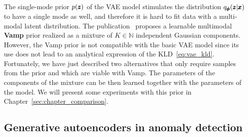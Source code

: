 The single-mode prior $p(\pmb{{z}})$ of the VAE model stimulates the distribution $q_{\pmb{{\phi}}}(\pmb{{z}}|\pmb{{x}})$ to have a single mode as well, and therefore it is hard to fit data with a multi-modal latent distribution. The publication~\cite{tomczak2018vae} proposes a learnable multimodal \textbf{Vamp} prior realized as a mixture of $K \in \mathbb{N}$ independent Gaussian components. However, the Vamp prior is not compatible with the basic VAE model since its use does not lead to an analytical expression of the KLD~\eqref{eq:vae_kld}. Fortunately, we have just described two alternatives that only require samples from the prior and which are viable with Vamp. The parameters of the components of the mixture can be then learned together with the parameters of the model. We will present some experiments with this prior in Chapter~\ref{sec:chapter_comparison}.

\subsection{Generative autoencoders in anomaly detection} \label{sec:ad_genmodels}

